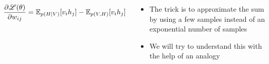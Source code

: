 \begin{frame}
\end{frame}
		
\begin{frame}
	\begin{columns}
		\begin{overlayarea}{\textwidth}{\textheight}
			\begin{align*}
				\hspace{-0.5cm}\frac{\partial \mathscr{L}(\theta)}{\partial w_{ij}} = \mathbb{E}_{p(H|V)} [v_i h_j] - \mathbb{E}_{p(V,H)} [v_i h_j]
			\end{align*}
		\end{overlayarea}
		\begin{overlayarea}{\textwidth}{\textheight}
			\begin{itemize}
				\item<1-> The trick is to approximate the sum by using a few samples instead of an exponential number of samples
				\item<2-> We will try to understand this with the help of an analogy
			\end{itemize}
		\end{overlayarea}
	\end{columns}
\end{frame}



